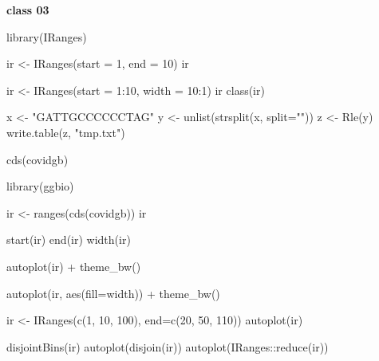 \documentclass[
]{book}
\newenvironment{Shaded}{\begin{snugshade}}{\end{snugshade}}
\newcommand{\AttributeTok}[1]{\textcolor[rgb]{0.77,0.63,0.00}{#1}}
\newcommand{\DecValTok}[1]{\textcolor[rgb]{0.00,0.00,0.81}{#1}}
\newcommand{\FunctionTok}[1]{\textcolor[rgb]{0.00,0.00,0.00}{#1}}
\newcommand{\NormalTok}[1]{#1}
\newcommand{\OtherTok}[1]{\textcolor[rgb]{0.56,0.35,0.01}{#1}}
\newcommand{\SpecialCharTok}[1]{\textcolor[rgb]{0.00,0.00,0.00}{#1}}
\newcommand{\StringTok}[1]{\textcolor[rgb]{0.31,0.60,0.02}{#1}}
\begin{document}
\textbf{class 03}

\begin{Shaded}
\begin{Highlighting}[]
\FunctionTok{library}\NormalTok{(IRanges)}

\NormalTok{ir }\OtherTok{\textless{}{-}} \FunctionTok{IRanges}\NormalTok{(}\AttributeTok{start =} \DecValTok{1}\NormalTok{, }\AttributeTok{end =} \DecValTok{10}\NormalTok{)}
\NormalTok{ir}

\NormalTok{ir }\OtherTok{\textless{}{-}} \FunctionTok{IRanges}\NormalTok{(}\AttributeTok{start =} \DecValTok{1}\SpecialCharTok{:}\DecValTok{10}\NormalTok{, }\AttributeTok{width =} \DecValTok{10}\SpecialCharTok{:}\DecValTok{1}\NormalTok{)}
\NormalTok{ir}
\FunctionTok{class}\NormalTok{(ir)}

\NormalTok{x }\OtherTok{\textless{}{-}} \StringTok{"GATTGCCCCCCTAG"}
\NormalTok{y }\OtherTok{\textless{}{-}} \FunctionTok{unlist}\NormalTok{(}\FunctionTok{strsplit}\NormalTok{(x, }\AttributeTok{split=}\StringTok{""}\NormalTok{))}
\NormalTok{z }\OtherTok{\textless{}{-}} \FunctionTok{Rle}\NormalTok{(y)}
\FunctionTok{write.table}\NormalTok{(z, }\StringTok{"tmp.txt"}\NormalTok{)}
\end{Highlighting}
\end{Shaded}

\begin{Shaded}
\begin{Highlighting}[]
\FunctionTok{cds}\NormalTok{(covidgb)}
\end{Highlighting}
\end{Shaded}

\begin{Shaded}
\begin{Highlighting}[]
\FunctionTok{library}\NormalTok{(ggbio)}

\NormalTok{ir }\OtherTok{\textless{}{-}} \FunctionTok{ranges}\NormalTok{(}\FunctionTok{cds}\NormalTok{(covidgb))}
\NormalTok{ir}

\FunctionTok{start}\NormalTok{(ir)}
\FunctionTok{end}\NormalTok{(ir)}
\FunctionTok{width}\NormalTok{(ir)}

\FunctionTok{autoplot}\NormalTok{(ir) }\SpecialCharTok{+}
  \FunctionTok{theme\_bw}\NormalTok{()}

\FunctionTok{autoplot}\NormalTok{(ir, }\FunctionTok{aes}\NormalTok{(}\AttributeTok{fill=}\NormalTok{width)) }\SpecialCharTok{+}
  \FunctionTok{theme\_bw}\NormalTok{()}




\NormalTok{ir }\OtherTok{\textless{}{-}} \FunctionTok{IRanges}\NormalTok{(}\FunctionTok{c}\NormalTok{(}\DecValTok{1}\NormalTok{, }\DecValTok{10}\NormalTok{, }\DecValTok{100}\NormalTok{), }\AttributeTok{end=}\FunctionTok{c}\NormalTok{(}\DecValTok{20}\NormalTok{, }\DecValTok{50}\NormalTok{, }\DecValTok{110}\NormalTok{))}
\FunctionTok{autoplot}\NormalTok{(ir)}


\FunctionTok{disjointBins}\NormalTok{(ir)}
\FunctionTok{autoplot}\NormalTok{(}\FunctionTok{disjoin}\NormalTok{(ir))}
\FunctionTok{autoplot}\NormalTok{(IRanges}\SpecialCharTok{::}\FunctionTok{reduce}\NormalTok{(ir))}
\end{Highlighting}
\end{Shaded}
\end{document}
